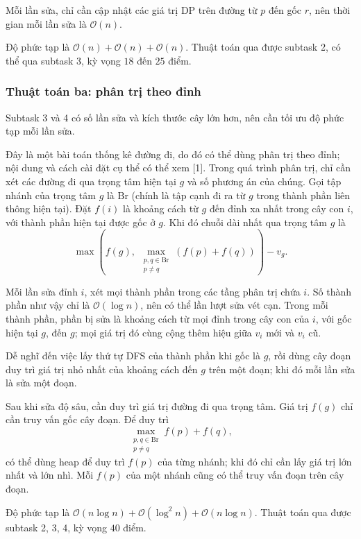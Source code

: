 \documentclass[11pt]{article}
\newcommand{\Oh}{\mathcal{O}}
\begin{document}
Mỗi lần sửa, chỉ cần cập nhật các giá trị DP trên đường từ \(p\) đến gốc
\(r\), nên thời gian mỗi lần sửa là \(\Oh(n)\).

Độ phức tạp là \(\Oh(n)+\Oh(n)+\Oh(n)\). Thuật toán qua được subtask 2, có thể
qua subtask 3, kỳ vọng \(18\) đến \(25\) điểm.

\subsubsection{Thuật toán ba: phân trị theo đỉnh}

Subtask 3 và 4 có số lần sửa và kích thước cây lớn hơn, nên cần tối ưu độ phức
tạp mỗi lần sửa.

Đây là một bài toán thống kê đường đi, do đó có thể dùng phân trị theo đỉnh;
nội dung và cách cài đặt cụ thể có thể xem [1]. Trong quá trình phân trị, chỉ
cần xét các đường đi qua trọng tâm hiện tại \(g\) và số phương án của chúng.
Gọi tập nhánh của trọng tâm \(g\) là \(\mathrm{Br}\) (chính là tập cạnh đi ra
từ \(g\) trong thành phần liên thông hiện tại). Đặt \(f(i)\) là khoảng cách từ
\(g\) đến đỉnh xa nhất trong cây con \(i\), với thành phần hiện tại được gốc ở
\(g\). Khi đó chuỗi dài nhất qua trọng tâm \(g\) là
\[
  \max\left(f(g),\ \max_{\substack{p,q\in\mathrm{Br}\\p\ne q}}(f(p)+f(q))\right)-v_g.
\]

Mỗi lần sửa đỉnh \(i\), xét mọi thành phần trong các tầng phân trị chứa \(i\).
Số thành phần như vậy chỉ là \(\Oh(\log n)\), nên có thể lần lượt sửa vét cạn.
Trong mỗi thành phần, phần bị sửa là khoảng cách từ mọi đỉnh trong cây con của
\(i\), với gốc hiện tại \(g\), đến \(g\); mọi giá trị đó cùng cộng thêm hiệu
giữa \(v_i\) mới và \(v_i\) cũ.

Dễ nghĩ đến việc lấy thứ tự DFS của thành phần khi gốc là \(g\), rồi dùng cây
đoạn duy trì giá trị nhỏ nhất của khoảng cách đến \(g\) trên một đoạn; khi đó
mỗi lần sửa là sửa một đoạn.

Sau khi sửa độ sâu, cần duy trì giá trị đường đi qua trọng tâm. Giá trị
\(f(g)\) chỉ cần truy vấn gốc cây đoạn. Để duy trì
\[
  \max_{\substack{p,q\in\mathrm{Br}\\p\ne q}} f(p)+f(q),
\]
có thể dùng heap để duy trì \(f(p)\) của từng nhánh; khi đó chỉ cần lấy giá
trị lớn nhất và lớn nhì. Mỗi \(f(p)\) của một nhánh cũng có thể truy vấn đoạn
trên cây đoạn.

Độ phức tạp là \(\Oh(n\log n)+\Oh(\log^2 n)+\Oh(n\log n)\). Thuật toán qua
được subtask 2, 3, 4, kỳ vọng \(40\) điểm.
\end{document}
